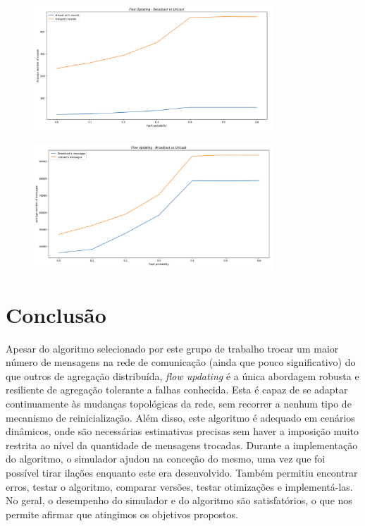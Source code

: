 \documentclass[a4paper]{report}
\begin{document}
{	\begin{figure}[H]
		\centering
		\includegraphics[width=0.8\textwidth]{Images/Plot3.png}
		\label{fig:3}
	\end{figure}

	\begin{figure}[H]
		\centering
		\includegraphics[width=0.8\textwidth]{Images/Plot4.png}
		\label{fig:4}
	\end{figure}
}

{\let\clearpage\relax \chapter{Conclusão} \label{ch:Conclusion}}
\large{
	Apesar do algoritmo selecionado por este grupo de trabalho trocar um maior número de mensagens na rede de comunicação (ainda que pouco significativo) do que outros de agregação distribuída, \textit{flow updating} é a única abordagem robusta e resiliente de agregação tolerante a falhas conhecida.
	Esta é capaz de se adaptar continuamente às mudanças topológicas da rede, sem recorrer a nenhum tipo de mecanismo de reinicialização. Além disso, este algoritmo é adequado em cenários dinâmicos, onde são necessárias estimativas precisas sem haver a imposição muito restrita ao nível da quantidade de mensagens trocadas.
	Durante a implementação do algoritmo, o simulador ajudou na conceção do mesmo, uma vez que foi possível tirar ilações enquanto este era desenvolvido. 
	Também permitiu encontrar erros, testar o algoritmo, comparar versões, testar otimizações e implementá-las.
	No geral, o desempenho do simulador e do algoritmo são satisfatórios, o que nos permite afirmar que atingimos os objetivos propostos.
}

\printbibliography[heading=bibintoc]
\end{document}
